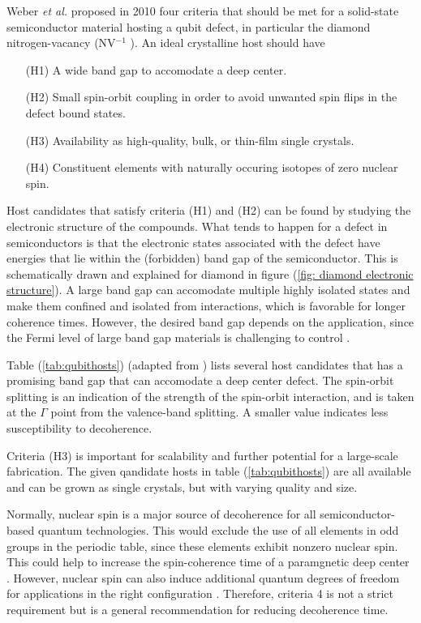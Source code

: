 
Weber \textit{et al.} \cite{Weber2010} proposed in 2010 four criteria that should be met for a solid-state semiconductor material hosting a qubit defect, in particular the diamond nitrogen-vacancy (NV$^{-1}$ ). An ideal crystalline host should have \cite{Weber2010}
\begin{itemize}
  \item[(H1)] A wide band gap to accomodate a deep center.
  \item[(H2)] Small spin-orbit coupling in order to avoid unwanted spin flips in the defect bound states.
  \item[(H3)] Availability as high-quality, bulk, or thin-film single crystals.
  \item[(H4)] Constituent elements with naturally occuring isotopes of zero nuclear spin.
\end{itemize}

Host candidates that satisfy criteria (H1) and (H2) can be found by studying the electronic structure of the compounds. What tends to happen for a defect in semiconductors is that the electronic states associated with the defect have energies that lie within the (forbidden) band gap of the semiconductor. This is schematically drawn and explained for diamond in figure (\ref{fig: diamond electronic structure}). A large band gap can accomodate multiple highly isolated states and make them confined and isolated from interactions, which is favorable for longer coherence times. However, the desired band gap depends on the application, since the Fermi level of large band gap materials is challenging to control \cite{Bassett2019}.



Table (\ref{tab:qubithosts}) (adapted from \cite{Weber2010}) lists several host candidates that has a promising band gap that can accomodate a deep center defect. The spin-orbit splitting is an indication of the strength of the spin-orbit interaction, and is taken at the $\Gamma$ point from the valence-band splitting. A smaller value indicates less susceptibility to decoherence.


Criteria (H3) is important for scalability and further potential for a large-scale fabrication. The given qandidate hosts in table (\ref{tab:qubithosts}) are all available and can be grown as single crystals, but with varying quality and size.

Normally, nuclear spin is a major source of decoherence for all semiconductor-based quantum technologies. This would exclude the use of all elements in odd groups in the periodic table, since these elements exhibit nonzero nuclear spin. This could help to increase the spin-coherence time of a paramgnetic deep center \cite{Weber2010}. However, nuclear spin can also induce additional quantum degrees of freedom for applications in the right configuration \cite{Bassett2019}. Therefore, criteria 4 is not a strict requirement but is a general recommendation for reducing decoherence time.  %

